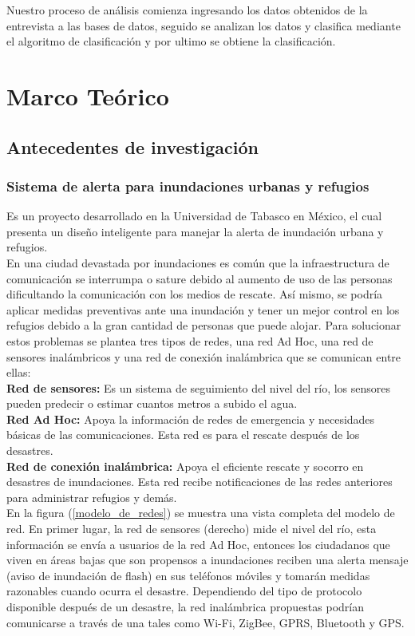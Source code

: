 \documentclass[11pt,openany]{book}
\newcounter{ns}
\begin{document}
	Nuestro proceso de análisis comienza ingresando los datos obtenidos de la entrevista a las bases de datos, seguido se analizan los datos y clasifica mediante el algoritmo de clasificación y por ultimo se obtiene la clasificación.


	\chapter{Marco Teórico}
	\newpage

	\section{Antecedentes de investigación}

	\subsection{Sistema de alerta para inundaciones urbanas y refugios \cite{Wister2013}}
	Es un proyecto desarrollado en la Universidad de Tabasco en México, el cual presenta un diseño inteligente para manejar la alerta de inundación urbana y refugios.\\
	En una ciudad devastada por inundaciones es común que la infraestructura de comunicación se interrumpa o sature debido al aumento de uso de las personas dificultando la comunicación con los medios de rescate. Así mismo, se podría aplicar medidas preventivas ante una inundación y tener un mejor control en los refugios debido a la gran cantidad de personas que puede alojar. Para solucionar estos problemas se plantea  tres tipos de redes, una red Ad Hoc, una red de sensores inalámbricos y una red de conexión inalámbrica que se comunican entre ellas:\\
	\textbf{Red de sensores: }Es un sistema de seguimiento del nivel del río, los sensores pueden predecir o estimar cuantos metros a subido el agua.\\
	\textbf{Red Ad Hoc: }Apoya la información de redes de emergencia y necesidades básicas de las comunicaciones. Esta red es para el rescate después de los desastres.\\
	\textbf{Red de conexión inalámbrica: }Apoya el eficiente rescate y socorro en desastres de inundaciones. Esta red recibe notificaciones de las redes anteriores para administrar refugios y demás.\\[0.25 cm]
	En la figura (\ref{modelo_de_redes}) se muestra una vista completa del modelo de red. En primer lugar, la red de  sensores (derecho) mide el nivel del río, esta información se envía a usuarios de la red Ad Hoc, entonces los ciudadanos que viven en áreas bajas que son propensos a inundaciones reciben una alerta mensaje (aviso de inundación de flash) en sus teléfonos móviles y tomarán medidas razonables cuando ocurra el desastre. Dependiendo del tipo de protocolo disponible después de un desastre, la red inalámbrica propuestas podrían comunicarse a través de una tales como Wi-Fi, ZigBee, GPRS, Bluetooth y GPS.
\end{document}
